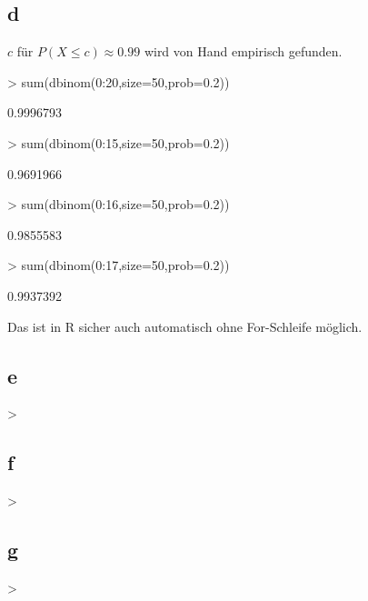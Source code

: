 \subsection{d}
$c$ für $P(X \leq c) \approx 0.99$ wird von Hand empirisch gefunden. 
\begin{Schunk}
\begin{Sinput}
> sum(dbinom(0:20,size=50,prob=0.2))
\end{Sinput}
\begin{Soutput}
[1] 0.9996793
\end{Soutput}
\begin{Sinput}
> sum(dbinom(0:15,size=50,prob=0.2))
\end{Sinput}
\begin{Soutput}
[1] 0.9691966
\end{Soutput}
\begin{Sinput}
> sum(dbinom(0:16,size=50,prob=0.2))
\end{Sinput}
\begin{Soutput}
[1] 0.9855583
\end{Soutput}
\begin{Sinput}
> sum(dbinom(0:17,size=50,prob=0.2))
\end{Sinput}
\begin{Soutput}
[1] 0.9937392
\end{Soutput}
\end{Schunk}
Das ist in R sicher auch automatisch ohne For-Schleife möglich. 

\subsection{e}
\begin{Schunk}
\begin{Sinput}
> 
\end{Sinput}
\end{Schunk}

\subsection{f}
\begin{Schunk}
\begin{Sinput}
> 
\end{Sinput}
\end{Schunk}

\subsection{g}
\begin{Schunk}
\begin{Sinput}
> 
\end{Sinput}
\end{Schunk}
